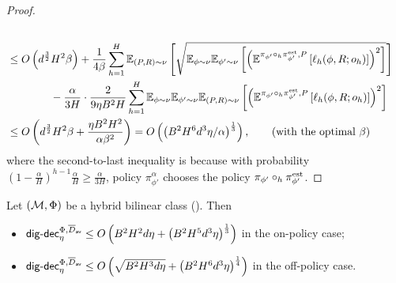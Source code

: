 \begin{proof}
\begin{align*}
    \\&\le O\left(d^{\frac{3}{2}}H^2\beta\right) + \frac{1}{4\beta}\sum_{h=1}^H\E_{(P,R) \sim \nu}\left[\sqrt{\E_{\phi \sim \nu}\E_{\phi' \sim \nu}\left[\left(  \E^{\pi_{\phi'}\circ_h \pi_{\phi'}^{\esttt}, P}\left[\ellest_h(\phi, R; o_h)\right]\right)^2\right]}\right] 
      \\&\qquad \qquad - \frac{\alpha}{3H} \cdot \frac{2}{9\eta B^2 H}\sum_{h=1}^H \E_{\phi \sim \nu}\E_{\phi' \sim \nu}\E_{(P,R) \sim \nu} \left[\left( \E^{\pi_{\phi'} \circ_h \pi_{\phi'}^{\esttt}, P}\left[\ellest_h(\phi, R ; o_h)\right]\right)^2\right]
    \\&\le \order\left(d^{\frac{3}{2}}H^2\beta + \frac{\eta B^2 H^2}{\alpha \beta^2}\right) = \order\left(\left( B^2H^6 d^3\eta/\alpha\right)^{\frac{1}{3}}\right),  \tag{with the optimal $\beta$} %
\end{align*}
where the second-to-last inequality is because with probability $(1-\frac{\alpha}{H})^{h-1}\frac{\alpha}{H}\geq \frac{\alpha}{3 H}$, policy $\pi^\alpha_{\phi'}$ chooses the policy $\pi_{\phi'}\circ_h \pi_{\phi'}^{\operatorname*{est}}$. 
\end{proof}




\begin{lemma}\label{lem: digdec_adv < d hbi}
    Let $(\mathcal{M}, \Phi)$ be a hybrid bilinear class (). Then 
    \begin{itemize}[leftmargin=1em, nosep]
 \setlength{\itemsep}{0pt} %
    \setlength{\parskip}{0pt} 
    \setlength{\topsep}{0pt}
    \item $\mathsf{dig}\text{-}\mathsf{dec}_\eta^{\Phi,\overline{D}_{\mathsf{av}}}  \le O\left( B^2H^2d\eta + \left( B^2H^5d^3 \eta \right)^{\frac{1}{3}} \right)$ in the on-policy case; 
    \item $\mathsf{dig}\text{-}\mathsf{dec}_\eta^{\Phi,\overline{D}_{\mathsf{av}}}  \le O\left( \sqrt{B^2H^3 d \eta } + \left(B^2H^6 d^3 \eta\right)^{\frac{1}{4}} \right)$ in the off-policy case. 
\end{itemize}
\end{lemma}

